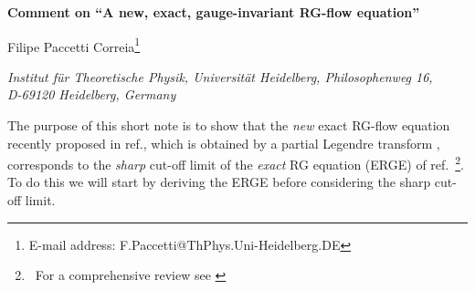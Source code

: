 \documentclass[a4paper,12pt]{article}
\begin{document}


\newcommand{\intx}{\int d^4 x\,}

\newcommand{\inty}{\int d^4 y\,}

\newcommand{\intk}{\int d^4 k\,}

\newcommand{\intp}{\int d^4 p\,}

\newcommand{\meio}{\frac{1}{2}}

\newcommand{\tr}{\,\text{tr}\,}

\begin{titlepage}


\begin{center}   
{\Large\bf
Comment on ``A new, exact, gauge-invariant RG-flow equation''}  
\end{center} 
\vspace{0.5cm} 
\begin{center} 
{\large Filipe \hspace{-0.07cm}Paccetti \hspace{-0.07cm}Correia\footnote{E-mail address: 
F.Paccetti@ThPhys.Uni-Heidelberg.DE}  
} 
\vspace{0.5cm}


{\em Institut f\"ur Theoretische Physik, Universit\"at Heidelberg,
Philosophenweg 16,\\
 D-69120 Heidelberg, Germany \\

} 

\end{center}

\vspace{1.0cm} 

\begin{abstract}
We show that the exact RG-flow equation introduced re\-cent\-ly in hep-th/ 0207134 can be obtained in the sharp cut-off limit of the well-known ERGE. This can be expected from the fact that in this limit the new scale-dependent effective action coincides with the one which is usually considered.  
\end{abstract}

\end{titlepage}

The purpose of this short note is to show that the \emph{new} exact RG-flow equation recently proposed in ref.\cite{Bra02}, which is obtained by a partial Legendre transform , corresponds to the \emph{sharp} cut-off limit of the \emph{exact} RG equation (ERGE) of ref.\cite{wet93,bon93}~\footnote{~For a comprehensive review see \cite{ber02}}. To do this we will start by deriving the ERGE before considering the sharp cut-off limit.
\end{document}
